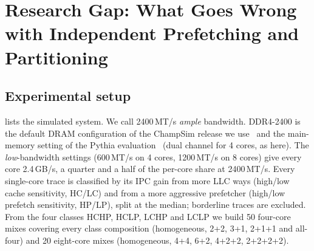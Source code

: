 \section{Research Gap: What Goes Wrong with Independent Prefetching and Partitioning}
\label{sec:problem}

\subsection{Experimental setup}
\label{sec:setup}

\begin{table}[!htbp]
\centering
\caption{Simulated system.}
\label{tab:system}
\footnotesize
{}
\end{table}

 lists the simulated system.  We call 2400\,MT/s \emph{ample} bandwidth.  DDR4-2400 is the
default DRAM configuration of the ChampSim release we use~\cite{gober2022champsim} and the main-memory setting of the
Pythia evaluation~\cite{bera2021pythia} (dual channel for 4 cores, as here).
The \emph{low}-bandwidth settings (600\,MT/s on 4 cores, 1200\,MT/s on 8 cores) give every core 2.4\,GB/s, a quarter
and a half of the per-core share at 2400\,MT/s.  Every single-core trace is classified by its IPC gain from more LLC
ways (high/low cache sensitivity, HC/LC) and from a more aggressive prefetcher (high/low prefetch sensitivity, HP/LP),
split at the median; borderline traces are excluded.  From the four classes HCHP, HCLP, LCHP and LCLP we build 50
four-core mixes covering every class composition (homogeneous, 2+2, 3+1, 2+1+1 and all-four) and 20 eight-core mixes
(homogeneous, 4+4, 6+2, 4+2+2, 2+2+2+2).

